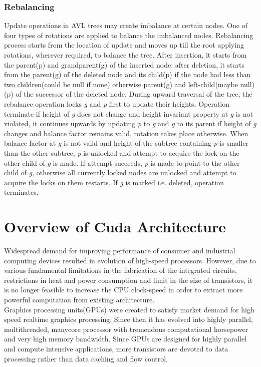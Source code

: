 \documentclass[MTech]{iitmdiss}
\begin{document}
\subsection{Rebalancing}
Update operations in AVL trees may create imbalance at certain nodes. One of four types of rotations are applied to balance the imbalanced nodes. Rebalancing process starts from the location of update and moves up till the root applying rotations, wherever required, to balance the tree. After insertion, it starts from the parent(p) and grandparent(g) of the inserted node; after deletion, it starts from the parent(g) of the deleted node and its child(p) if the node had less than two children(could be null if none) otherwise parent(g) and left-child(maybe null)(p) of the successor of the deleted node. During upward traversal of the tree, the rebalance operation locks \textit{g} and \textit{p} first to update their heights. Operation terminate if height of \textit{g} does not change and height invariant property at \textit{g} is not violated, it continues upwards by updating \textit{p} to \textit{g} and \textit{g} to its parent if height of \textit{g} changes and balance factor remains valid, rotation takes place otherwise. When balance factor at \textit{g} is not valid and height of the
subtree containing \textit{p} is smaller than the other subtree, \textit{p} is unlocked and attempt to acquire the lock on the other child of \textit{g} is made. If attempt succeeds, \textit{p} is made to point to the other child of \textit{g}, otherwise all currently locked nodes are unlocked and attempt to acquire the locks on them restarts. If \textit{g} is marked i.e. deleted, operation terminates. 



\chapter{Overview of Cuda Architecture}
\label{chap:cuda}
Widespread demand for improving performance of consumer and industrial computing devices resulted in evolution of high-speed processors. However, due to various fundamental limitations in the fabrication of the integrated circuits, restrictions in heat and power consumption and limit in the size of transistors, it is no longer feasible to increase the CPU clock-speed in order to extract more powerful computation from existing architecture. \\
\indent Graphics processing units(GPUs) were created to satisfy market demand for high speed realtime graphics processing. Since then it has evolved into highly parallel, multithreaded, manycore processor with tremendous computational horsepower and very high memory bandwidth. Since GPUs are designed for highly parallel and compute intensive applications, more transistors are devoted to data processing rather than data caching and flow control. 
   
\end{document}
